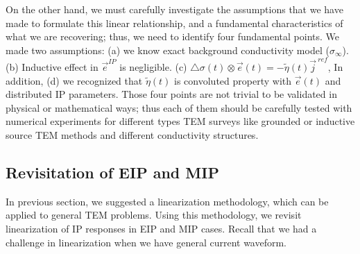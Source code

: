 \documentclass[a4paper, 11pt]{article}
\newcommand{\siginf}{\sigma_\infty}
\newcommand{\dsig}{\triangle\sigma}
\renewcommand {\j}  { {\vec j} }
\newcommand {\e}  { {\vec e} }
\newcommand{\peta}{\tilde{\eta}}
\begin{document}
On the other hand, we must carefully investigate the assumptions that we have made to formulate this linear relationship, and a fundamental characteristics of what we are recovering; thus, we need to identify four fundamental points. We made two assumptions: (a) we know exact background conductivity model ($\siginf$). (b) Inductive effect in $\e^{IP}$ is negligible. (c) $\dsig(t)\otimes \e(t) = -\peta(t)\j^{\ ref}$, In addition, (d) we recognized that $\peta(t)$ is convoluted property with $\e(t)$ and distributed IP parameters. Those four points are not trivial to be validated in physical or mathematical ways; thus each of them should be carefully tested with numerical experiments for different types TEM surveys like grounded or inductive source TEM methods and different conductivity structures.

\subsection{Revisitation of EIP and MIP}
In previous section, we suggested a linearization methodology, which can be applied to general TEM problems. Using this methodology, we revisit linearization of IP responses in EIP and MIP cases. Recall that we had a challenge in linearization when we have general current waveform.
\end{document}
